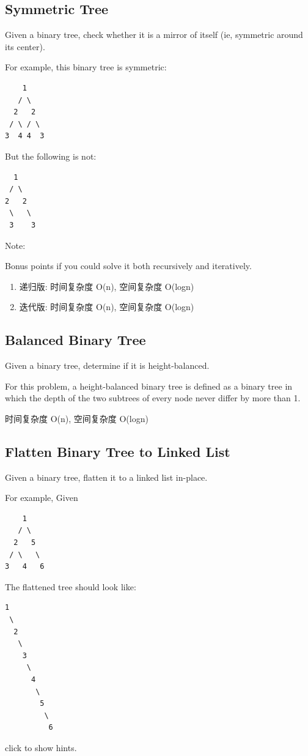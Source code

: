 \documentclass[12pt]{book}
\begin{document}
\subsection{Symmetric Tree}
\label{sec-4-1-9}
Given a binary tree, check whether it is a mirror of itself (ie, symmetric around its center).

For example, this binary tree is symmetric:
\lstset{language=java,label= ,caption= ,numbers=none}
\begin{lstlisting}
    1
   / \
  2   2
 / \ / \
3  4 4  3
\end{lstlisting}
But the following is not:
\lstset{language=java,label= ,caption= ,numbers=none}
\begin{lstlisting}
  1
 / \
2   2
 \   \
 3    3
\end{lstlisting}
Note:

Bonus points if you could solve it both recursively and iteratively.
\begin{enumerate}
\item 递归版: 时间复杂度 O(n), 空间复杂度 O(logn)
\label{sec-4-1-9-1}
\item 迭代版: 时间复杂度 O(n), 空间复杂度 O(logn)
\label{sec-4-1-9-2}
\end{enumerate}


\subsection{Balanced Binary Tree}
\label{sec-4-1-10}
Given a binary tree, determine if it is height-balanced.

For this problem, a height-balanced binary tree is defined as a binary tree in which the depth of the two subtrees of every node never differ by more than 1.

时间复杂度 O(n), 空间复杂度 O(logn)

\subsection{Flatten Binary Tree to Linked List}
\label{sec-4-1-11}
Given a binary tree, flatten it to a linked list in-place.

For example, Given
\lstset{language=java,label= ,caption= ,numbers=none}
\begin{lstlisting}
    1
   / \
  2   5
 / \   \
3   4   6
\end{lstlisting}

The flattened tree should look like:
\lstset{language=java,label= ,caption= ,numbers=none}
\begin{lstlisting}
1
 \
  2
   \
    3
     \
      4
       \
        5
         \
          6
\end{lstlisting}
click to show hints.
\end{document}
